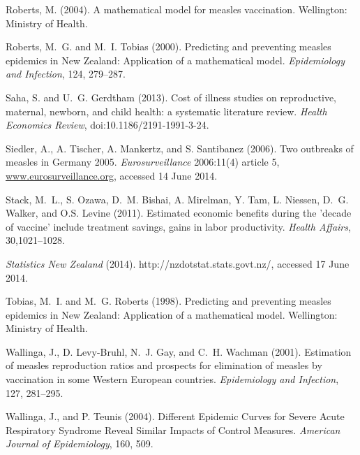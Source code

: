 \documentclass{article}
\begin{document}
\begin{itemize}
\begin{thebibliography}{}
Roberts, M. (2004).
\newblock A mathematical model for measles vaccination.
\newblock Wellington: Ministry of Health.

Roberts, M.~G. and M.~I. Tobias (2000).
\newblock Predicting and preventing measles epidemics in New Zealand: Application of a mathematical model. 
\newblock \emph{Epidemiology and Infection}, 124, 279--287.

Saha, S. and U.~G. Gerdtham (2013).
\newblock Cost of illness studies on reproductive, maternal, newborn, and child health: a systematic literature review.
\newblock \emph{Health Economics Review}, doi:10.1186/2191-1991-3-24.

Siedler, A., A. Tischer, A. Mankertz, and S. Santibanez (2006).
\newblock Two outbreaks of measles in Germany 2005.
\newblock \emph{Eurosurveillance} 2006:11(4) article 5, \href{http://www.eurosurveillance.org/ViewArticle.aspx?ArticleId=615}{www.eurosurveillance.org}, accessed 14 June 2014.

Stack, M.~L., S. Ozawa, D.~M. Bishai, A. Mirelman, Y. Tam, L. Niessen, D.~G. Walker, and O.S. Levine (2011).
\newblock Estimated economic benefits during the 'decade of vaccine' include treatment savings, gains in labor productivity.
\newblock \emph{Health Affairs}, 30,1021--1028.

\newblock \emph{Statistics New Zealand} (2014).
http://nzdotstat.stats.govt.nz/, accessed 17 June 2014.

Tobias, M.~I. and M.~G. Roberts (1998).
\newblock Predicting and preventing measles epidemics in New Zealand: Application of a mathematical model.
\newblock Wellington: Ministry of Health.

Wallinga, J., D. Levy-Bruhl, N.~J. Gay, and C.~H. Wachman (2001).
\newblock Estimation of measles reproduction ratios and prospects for elimination of measles by vaccination in some Western European countries.
\newblock \emph{Epidemiology and Infection}, 127, 281--295.

Wallinga, J., and P. Teunis (2004).
\newblock Different Epidemic Curves for Severe Acute Respiratory Syndrome Reveal Similar Impacts of Control Measures.
\newblock \emph{American Journal of Epidemiology}, 160, 509.


\end{thebibliography}
\end{itemize}
\end{document}
